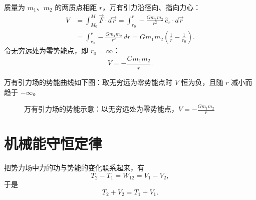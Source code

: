 质量为 $m_1$、$m_2$ 的两质点相距 $r$，万有引力沿径向、指向力心：
\begin{equation}\label{eq:13-V-newton-int}
\begin{aligned}
  V &=\int_{M_0}^{M}\vec{F}\cdot d\vec{r}
     =\int_{r_0}^{r}-\frac{Gm_1m_2}{r^2}\,\hat{e}_r\cdot d\vec{r}\\
    &=\int_{r_0}^{r}-\frac{Gm_1m_2}{r^2}\,dr
     =Gm_1m_2\left(\frac{1}{r}-\frac{1}{r_0}\right).
\end{aligned}
\end{equation}
令无穷远处为零势能点，即 $r_0=\infty$：
\begin{equation}\label{eq:13-V-newton}
  V=-\frac{Gm_1m_2}{r}.
\end{equation}

万有引力场的势能曲线如下图：取无穷远为零势能点时 $V$ 恒为负，且随 $r$ 减小而趋于 $-\infty$。
\begin{figure}[H]
    \centering
    \caption{万有引力场的势能示意：以无穷远处为零势能点，$V=-\frac{Gm_1m_2}{r}$}
    \label{fig:13-V-newton}
\end{figure}

\section{机械能守恒定律}

把势力场中力的功与势能的变化联系起来，有
\begin{equation}\label{eq:13-em-work}
  T_2-T_1=W_{12}=V_1-V_2,
\end{equation}
于是
\begin{equation}\label{eq:13-em-conserved}
  T_2+V_2=T_1+V_1 .
\end{equation}


